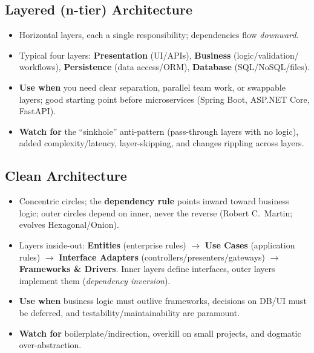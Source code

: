 \documentclass[hidelinks]{article}
\begin{document}
\subsection{Layered (n-tier) Architecture}
\begin{itemize}
  \item Horizontal layers, each a single responsibility; dependencies flow \emph{downward}.
  \item Typical four layers: \textbf{Presentation} (UI/APIs), \textbf{Business} (logic/validation/
        workflows), \textbf{Persistence} (data access/ORM), \textbf{Database} (SQL/NoSQL/files).
  \item \textbf{Use when} you need clear separation, parallel team work, or swappable layers; good
        starting point before microservices (Spring Boot, ASP.NET Core, FastAPI).
  \item \textbf{Watch for} the ``sinkhole'' anti-pattern (pass-through layers with no logic), added
        complexity/latency, layer-skipping, and changes rippling across layers.
\end{itemize}

\subsection{Clean Architecture}
\begin{itemize}
  \item Concentric circles; the \textbf{dependency rule} points inward toward business logic; outer
        circles depend on inner, never the reverse (Robert C.~Martin; evolves Hexagonal/Onion).
  \item Layers inside-out: \textbf{Entities} (enterprise rules) $\to$ \textbf{Use Cases}
        (application rules) $\to$ \textbf{Interface Adapters} (controllers/presenters/gateways)
        $\to$ \textbf{Frameworks \& Drivers}. Inner layers define interfaces, outer layers implement
        them (\emph{dependency inversion}).
  \item \textbf{Use when} business logic must outlive frameworks, decisions on DB/UI must be
        deferred, and testability/maintainability are paramount.
  \item \textbf{Watch for} boilerplate/indirection, overkill on small projects, and dogmatic
        over-abstraction.
\end{itemize}
\end{document}
